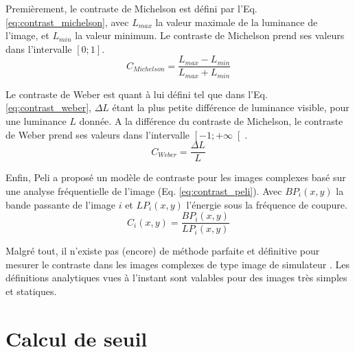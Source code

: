 	\par Premièrement, le contraste de Michelson est défini par l'Eq. \ref{eq:contrast_michelson}, avec $L_{max}$ la valeur maximale de la luminance de l'image, et $L_{min}$ la valeur minimum. Le contraste de Michelson prend ses valeurs dans l'intervalle $\left[0;1\right]$.
	\begin{equation}
	C_{Michelson}=\frac{L_{max}-L_{min}}{L_{max}+L_{min}}
	\label{eq:contrast_michelson}
	\end{equation}

	\par Le contraste de Weber est quant à lui défini tel que dans l'Eq. \ref{eq:contrast_weber}, $\Delta L$ étant la plus petite différence de luminance visible, pour une luminance $L$ donnée. A la différence du contraste de Michelson, le contraste de Weber prend ses valeurs dans l'intervalle $\left[-1;+\infty\right[$.
	\begin{equation}
	C_{Weber}=\frac{\Delta L}{L}
	\label{eq:contrast_weber}
	\end{equation}
	
	\par Enfin, Peli a proposé un modèle de contraste pour les images complexes basé sur une analyse fréquentielle de l'image (Eq. \ref{eq:contrast_peli}). Avec $BP_{i}(x,y)$ la bande passante de l'image $i$ et $LP_{i}(x,y)$ l'énergie sous la fréquence de coupure.
	\begin{equation}
	C_{i}(x,y) = \frac{BP_{i}(x,y)}{LP_{i}(x,y)}
	\label{eq:contrast_peli}
	\end{equation}
	
	\par Malgré tout, il n'existe pas (encore) de méthode parfaite et définitive pour mesurer le contraste dans les images complexes de type image de simulateur \citep{winkler_computing_1999}. Les définitions analytiques vues à l'instant sont valables pour des images très simples et statiques.
	
	\section{Calcul de seuil}
